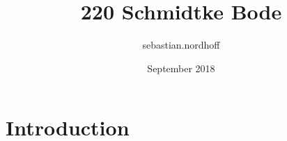 \documentclass{article}
\title{220 Schmidtke Bode}
\author{sebastian.nordhoff }
\date{September 2018}
\begin{document}
\maketitle

\section{Introduction}
\end{document}
